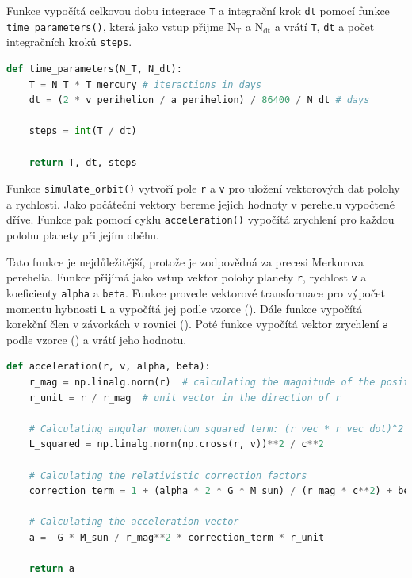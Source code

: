 \documentclass[a4paper,11pt,twocolumn]{article}
\begin{document}
            Funkce vypočítá celkovou dobu integrace \texttt{T} a integrační krok \texttt{dt} pomocí funkce \texttt{time\_parameters()}, která jako vstup přijme \texttt{$\text{N}_\text{T}$} a \texttt{$\text{N}_\text{dt}$} a vrátí \texttt{T}, \texttt{dt} a počet integračních kroků \texttt{steps}. 

\begin{lstlisting}[language=Python, caption={Parametry integrace}]
def time_parameters(N_T, N_dt):
    T = N_T * T_mercury # iteractions in days
    dt = (2 * v_perihelion / a_perihelion) / 86400 / N_dt # days

    steps = int(T / dt)
    
    return T, dt, steps
\end{lstlisting}

            Funkce \texttt{simulate\_orbit()} vytvoří pole \texttt{r} a \texttt{v} pro uložení vektorových dat polohy a rychlosti. Jako počáteční vektory bereme jejich hodnoty v perehelu vypočtené dříve. Funkce pak pomocí cyklu \texttt{acceleration()} vypočítá zrychlení pro každou polohu planety při jejím oběhu. 

            Tato funkce je nejdůležitější, protože je zodpovědná za precesi Merkurova perehelia. Funkce přijímá jako vstup vektor polohy planety \texttt{r}, rychlost \texttt{v} a koeficienty \texttt{alpha} a \texttt{beta}. Funkce provede vektorové transformace pro výpočet momentu hybnosti \texttt{L} a vypočítá jej podle vzorce (). Dále funkce vypočítá korekční člen v závorkách v rovnici (). Poté funkce vypočítá vektor zrychlení \texttt{a} podle vzorce () a vrátí jeho hodnotu.

\begin{lstlisting}[language=Python, caption={Výpočet zrychlení}]
def acceleration(r, v, alpha, beta):
    r_mag = np.linalg.norm(r)  # calculating the magnitude of the position vector
    r_unit = r / r_mag  # unit vector in the direction of r
    
    # Calculating angular momentum squared term: (r vec * r vec dot)^2 / c^2
    L_squared = np.linalg.norm(np.cross(r, v))**2 / c**2
    
    # Calculating the relativistic correction factors
    correction_term = 1 + (alpha * 2 * G * M_sun) / (r_mag * c**2) + beta * L_squared / r_mag**2
    
    # Calculating the acceleration vector
    a = -G * M_sun / r_mag**2 * correction_term * r_unit
    
    return a 
\end{lstlisting}
\end{document}
